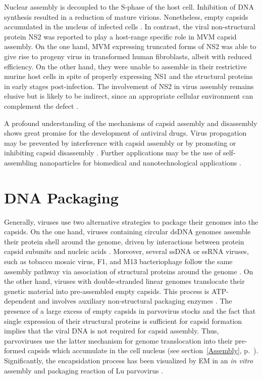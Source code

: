 Nuclear assembly is decoupled to the S-phase of the host cell. Inhibition of DNA synthesis resulted in a reduction of mature virions. Nonetheless, empty capsids accumulated in the nucleus of infected cells \cite{pmid559779, assembly}. In contrast, the viral non-structural protein NS2 was reported to play a host-range specific role in MVM capsid assembly. On the one hand, MVM expressing truncated forms of NS2 was able to give rise to progeny virus in transformed human fibroblasts, albeit with reduced efficiency. On the other hand, they were unable to assemble in their restrictive murine host cells in spite of properly expressing NS1 and the structural proteins in early stages post-infection. The involvement of NS2 in virus assembly remains elusive but is likely to be indirect, since an appropriate cellular environment can complement the defect \cite{pmid9168889}.        


A profound understanding of the mechanisms of capsid assembly and disassembly shows great promise for the development of antiviral drugs. Virus propagation may be prevented by interference with capsid assembly or by promoting or inhibiting capsid disassembly \cite{pmid21762804, pmid21163649}. Further applications may be the use of self-assembling nanoparticles for biomedical and nanotechnological applications \cite{pmid16521330, pmid16690856}.     


  
\section{DNA Packaging}
\label{Packaging}

Generally, viruses use two alternative strategies to package their genomes into the capsids. On the one hand, viruses containing circular dsDNA genomes assemble their protein shell around the genome, driven by interactions between protein capsid subunits and nucleic acids \cite{pmid6101085, pmid6305987, pmid1323699}. Moreover, several ssDNA or ssRNA viruses, such as tobacco mosaic virus, F1, and M13 bacteriophage follow the same assembly pathway via association of structural proteins around the genome \cite{pmid11406604}. On the other hand, viruses with double-stranded linear genomes translocate their genetic material into pre-assembled empty capsids. This process is ATP-dependent and involves auxiliary non-structural packaging enzymes \cite{pmid2679356}. The presence of a large excess of empty capsids in parvovirus stocks and the fact that single expression of their structural proteins is sufficient for capsid formation \cite{pmid1331503} implies that the viral DNA is not required for capsid assembly. Thus, parvoviruses use the latter mechanism for genome translocation into their pre-formed capsids which accumulate in the cell nucleus (see section~\ref{Assembly}, p.~\pageref{Assembly}). Significantly, the encapsidation process has been visualized by EM in an \textit{in vitro} assembly and packaging reaction of Lu parvovirus \cite{pmid6221078}.

